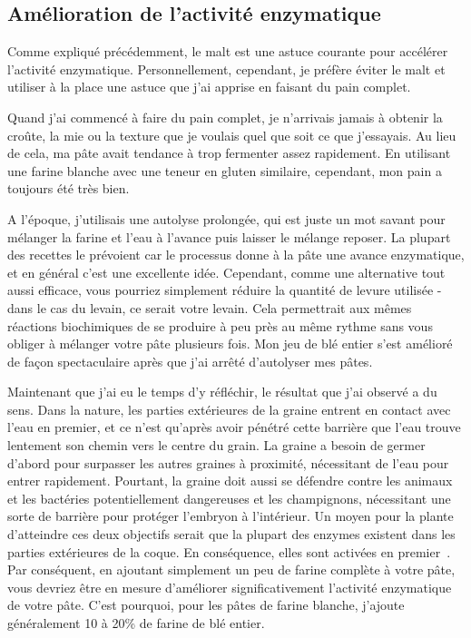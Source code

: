 \subsection{Amélioration de l'activité enzymatique}

Comme expliqué précédemment, le malt est une astuce courante pour accélérer l'activité enzymatique. Personnellement, cependant, je préfère éviter le malt et utiliser à la place une astuce que j'ai apprise en faisant du pain complet.

Quand j'ai commencé à faire du pain complet, je n'arrivais jamais à obtenir la croûte, la mie ou la texture que je voulais quel que soit ce que j'essayais. Au lieu de cela, ma pâte avait tendance à trop fermenter assez rapidement. En utilisant une farine blanche avec une teneur en gluten similaire, cependant, mon pain a toujours été très bien.

A l'époque, j'utilisais une autolyse prolongée, qui est juste un mot savant pour mélanger la farine et l'eau à l'avance puis laisser le mélange reposer. La plupart des recettes le prévoient car le processus donne à la pâte une avance enzymatique, et en général c'est une excellente idée. Cependant, comme une alternative tout aussi efficace, vous pourriez simplement réduire la quantité de levure utilisée - dans le cas du levain, ce serait votre levain. Cela permettrait aux mêmes réactions biochimiques de se produire à peu près au même rythme sans vous obliger à mélanger votre pâte plusieurs fois. Mon jeu de blé entier s'est amélioré de façon spectaculaire après que j'ai arrêté d'autolyser mes pâtes.

Maintenant que j'ai eu le temps d'y réfléchir, le résultat que j'ai observé a du sens. Dans la nature, les parties extérieures de la graine entrent en contact avec l'eau en premier, et ce n'est qu'après avoir pénétré cette barrière que l'eau trouve lentement son chemin vers le centre du grain. La graine a besoin de germer d'abord pour surpasser les autres graines à proximité, nécessitant de l'eau pour entrer rapidement. Pourtant, la graine doit aussi se défendre contre les animaux et les bactéries potentiellement dangereuses et les champignons, nécessitant une sorte de barrière pour protéger l'embryon à l'intérieur. Un moyen pour la plante d'atteindre ces deux objectifs serait que la plupart des enzymes existent dans les parties extérieures de la coque. En conséquence, elles sont activées en premier~\cite{enzymatic+activity+whole+wheat}. Par conséquent, en ajoutant simplement un peu de farine complète à votre pâte, vous devriez être en mesure d'améliorer significativement l'activité enzymatique de votre pâte. C'est pourquoi, pour les pâtes de farine blanche, j'ajoute généralement 10 à 20\% de farine de blé entier.

